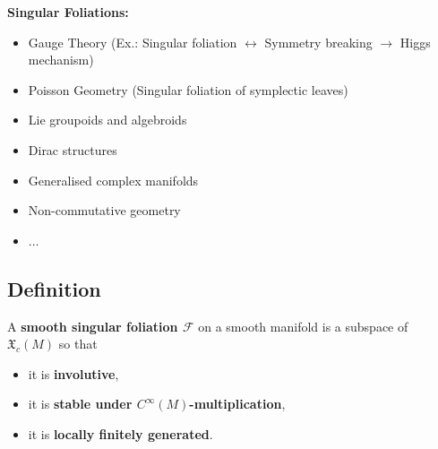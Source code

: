 \documentclass[hyperref={pdfpagelabels=false}]{beamer}
\newcommand\insertreferences{}
\theoremstyle{plain}
\theoremstyle{remark}
\begin{document}
{\begin{frame}
\end{frame}
}

{
\begin{frame}
\textbf{Singular Foliations:}

\begin{itemize}
	\item Gauge Theory \newline 
	(Ex.: Singular foliation $\leftrightarrow$ Symmetry breaking $\rightarrow$ Higgs mechanism)
	\item Poisson Geometry \newline (Singular foliation of symplectic leaves)
	\item Lie groupoids and algebroids
	\item Dirac structures
	\item Generalised complex manifolds
	\item Non-commutative geometry
	\item $\dotsc$
\end{itemize}

\end{frame}
}

\renewcommand\insertreferences{{\tiny  Peter Stefan, Accessible sets, orbits, and foliations with singularities. \textit{Proc.\ London Math.\ Soc.}, 29, 1974.
\newline
Héctor J. Sussmann, Orbits of families of vector fields and integrability of distributions. \textit{Trans.\ Amer.\ Math.\ Soc.}, 180, 1973}}

\subsection{Definition}

\begin{frame}
\begin{definition}
A \textbf{smooth singular foliation $\mathcal{F}$} on a smooth manifold is a subspace of $\mathfrak{X}_c(M)$ so that
\begin{itemize}
	\item it is \textbf{involutive},
	\item it is \textbf{stable under $C^\infty(M)$-multiplication},
	\item it is \textbf{locally finitely generated}.
\end{itemize}
\end{definition}
\end{frame}
\end{document}

